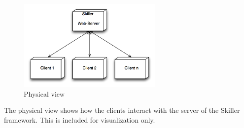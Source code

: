 \begin{figure}[H]
\begin{center}
\includegraphics[width=200pt]{./Images/PhysicalLayer1}
\end{center}
\caption{Physical view}
\end{figure}

The physical view shows how the clients interact with the server of the Skiller framework. This is included for visualization only.






